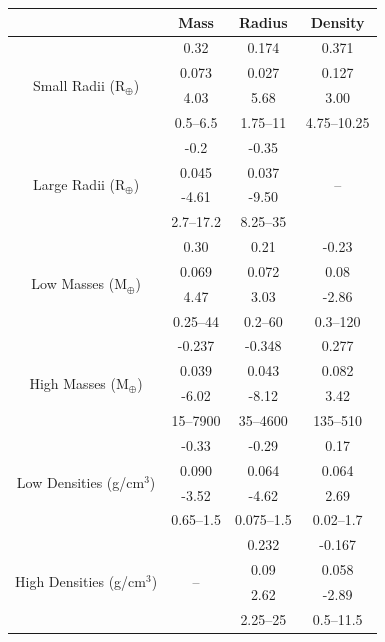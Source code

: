 \documentclass[a4paper,twocolumn,12pt]{article}
\begin{document}
\begin{table}[h!]
\begin{tabular}{ c | c | c | c }
\hline
& Mass & Radius & Density \\
\hline 
\multirow{4}{3em}{Small Radii (R$_\oplus$)}
& 0.32 & 0.174 & 0.371 \\ %
& 0.073 & 0.027 & 0.127 \\ %
& 4.03 & 5.68 & 3.00 \\ %
& 0.5--6.5 & 1.75--11 & 4.75--10.25 \\ %
\hline
\multirow{4}{3em}{Large Radii (R$_\oplus$)}
& -0.2 & -0.35 & \multirow{4}{0em}{--} \\ %
& 0.045 & 0.037 & \\ %
& -4.61 & -9.50 & \\ %
& 2.7--17.2 & 8.25--35 & \\ %
\hline
\hline
\multirow{4}{3em}{Low Masses (M$_\oplus$)}
& 0.30 & 0.21 & -0.23 \\ %
& 0.069 & 0.072 & 0.08 \\ %
& 4.47 & 3.03 & -2.86 \\ %
& 0.25--44 & 0.2--60 & 0.3--120 \\ %
\hline
\multirow{4}{3em}{High Masses (M$_\oplus$)}
& -0.237 & -0.348 & 0.277 \\ %
& 0.039 & 0.043 & 0.082 \\ %
& -6.02 & -8.12 & 3.42 \\ %
& 15--7900 & 35--4600 & 135--510 \\ %
\hline
\hline
\multirow{4}{3em}{Low Densities (g/cm$^3$)}
& -0.33 & -0.29 & 0.17 \\ %
& 0.090 & 0.064 & 0.064 \\ %
& -3.52 & -4.62 & 2.69 \\ %
& 0.65--1.5 & 0.075--1.5 & 0.02--1.7 \\ %
\hline
\multirow{4}{3em}{High Densities (g/cm$^3$)} & 
\multirow{4}{0em}{--}
 & 0.232 & -0.167\\ %
 & & 0.09 & 0.058 \\ %
 & & 2.62 & -2.89 \\ %
 & & 2.25--25 & 0.5--11.5 \\ %
 

\end{tabular}
\end{table}
\end{document}
